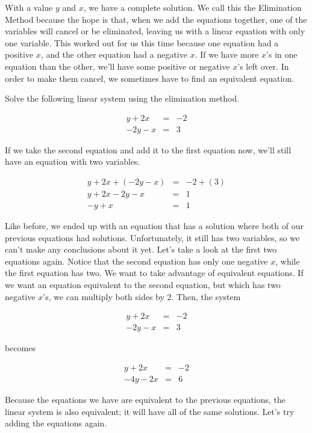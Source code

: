 With a value $y$ and $x$, we have a complete solution.  We call this the Elimination Method because the hope is that, when we add the equations together, one of the variables will cancel or be eliminated, leaving us with a linear equation with only one variable.  This worked out for us this time because one equation had a positive $x$, and the other equation had a negative $x$.  If we have more $x$'s in one equation than the other, we'll have some positive or negative $x$'s left over.  In order to make them cancel, we sometimes have to find an equivalent equation.

\begin{example}
Solve the following linear system using the elimination method.

$$\begin{array}{rcl}
y + 2x & = & -2\\
-2y - x & = & 3 \end{array}$$

If we take the second equation and add it to the first equation now, we'll still have an equation with two variables.

$$\begin{array}{rcl}
y + 2x + (-2y - x) & = & -2 + (3)\\
y + 2x - 2y - x & = & 1\\
-y + x & = & 1 \end{array}$$

Like before, we ended up with an equation that has a solution where both of our previous equations had solutions. Unfortunately, it still has two variables, so we can't make any conclusions about it yet.  Let's take a look at the first two equations again.  Notice that the second equation has only one negative $x$, while the first equation has two.  We want to take advantage of equivalent equations.  If we want an equation equivalent to the second equation, but which has two negative $x$'s, we can multiply both sides by 2. Then, the system

$$\begin{array}{rcl}
y + 2x & = & -2\\
-2y - x & = & 3 \end{array}$$

becomes

$$\begin{array}{rcl}
y + 2x & = & -2\\
-4y - 2x & = & 6 \end{array}$$

Because the equations we have are equivalent to the previous equations, the linear system is also equivalent; it will have all of the same solutions.  Let's try adding the equations again.


\end{example}
